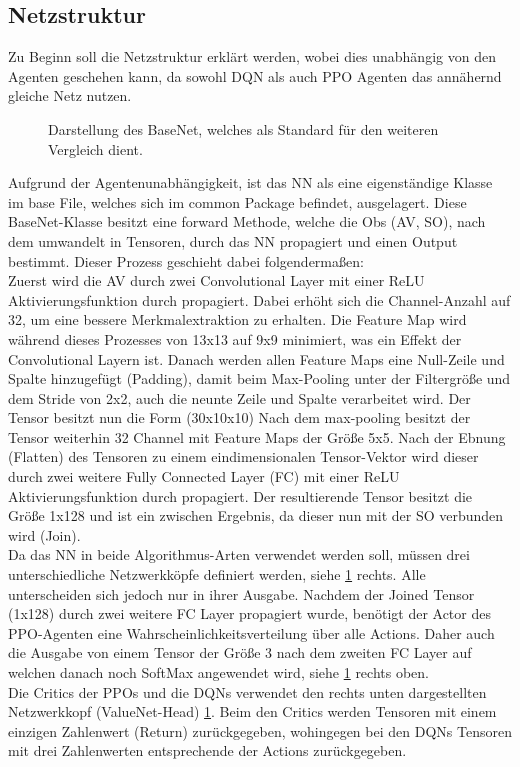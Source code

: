 \subsection{Netzstruktur} \label{sec:Impl_Netzstruktur}
Zu Beginn soll die Netzstruktur erklärt werden, wobei dies unabhängig von den Agenten geschehen kann, da sowohl DQN als auch PPO Agenten das annähernd gleiche Netz nutzen.
\begin{figure}[H]
	\centering
	\def\svgscale{0.80}
	
	\caption[BaseNet]{Darstellung des BaseNet, welches als Standard für den weiteren Vergleich dient.}
	\label{fig:Netzsturktur}
\end{figure}
Aufgrund der Agentenunabhängigkeit, ist das NN als eine eigenständige Klasse im base File, welches sich im common Package befindet, ausgelagert. 
Diese BaseNet-Klasse besitzt eine forward Methode, welche die Obs (AV, SO), nach dem umwandelt in Tensoren, durch das NN propagiert und einen Output bestimmt. Dieser Prozess geschieht dabei folgendermaßen:\\
Zuerst wird die AV durch zwei Convolutional Layer mit einer ReLU Aktivierungsfunktion durch propagiert. Dabei erhöht sich die Channel-Anzahl auf 32, um eine bessere Merkmalextraktion zu erhalten. Die Feature Map wird während dieses Prozesses von 13x13 auf 9x9 minimiert, was ein Effekt der Convolutional Layern ist. 
Danach werden allen Feature Maps eine Null-Zeile und Spalte hinzugefügt (Padding), damit beim Max-Pooling unter der Filtergröße und dem Stride von 2x2, auch die neunte Zeile und Spalte verarbeitet wird. Der Tensor besitzt nun die Form (30x10x10) 
Nach dem max-pooling besitzt der Tensor weiterhin 32 Channel mit Feature Maps der Größe 5x5. Nach der Ebnung (Flatten) des Tensoren zu einem eindimensionalen Tensor-Vektor wird dieser durch zwei weitere Fully Connected Layer (FC) mit einer ReLU Aktivierungsfunktion durch propagiert. Der resultierende Tensor besitzt die Größe 1x128 und ist ein zwischen Ergebnis, da dieser nun mit der SO verbunden wird (Join).\\
Da das NN in beide Algorithmus-Arten verwendet werden soll, müssen drei unterschiedliche Netzwerkköpfe definiert werden, siehe \ref{fig:Netzsturktur} rechts. Alle unterscheiden sich jedoch nur in ihrer Ausgabe. Nachdem der Joined Tensor (1x128) durch zwei weitere FC Layer propagiert wurde, benötigt der Actor des PPO-Agenten eine Wahrscheinlichkeitsverteilung über alle Actions. Daher auch die Ausgabe von einem Tensor der Größe 3 nach dem zweiten FC Layer auf welchen danach noch SoftMax angewendet wird, siehe \ref{fig:Netzsturktur} rechts oben.\\
Die Critics der PPOs und die DQNs verwendet den rechts unten dargestellten Netzwerkkopf (ValueNet-Head) \ref{fig:Netzsturktur}. Beim den Critics werden Tensoren mit einem einzigen Zahlenwert (Return) zurückgegeben, wohingegen bei den DQNs Tensoren mit drei Zahlenwerten entsprechende der Actions zurückgegeben.


